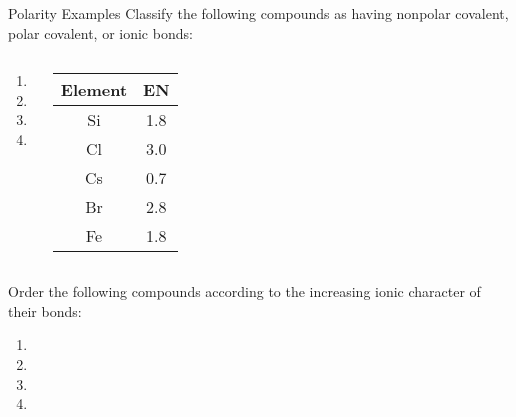 \documentclass[notes=hide]{beamer}
\begin{document}
\begin{frame}[t]{Polarity Examples}
	Classify the following compounds as having nonpolar covalent, polar
	covalent, or ionic bonds:

	\begin{columns}
		\begin{enumerate}
			\item {}
			\item {}
			\item {}
			\item {}
		\end{enumerate}
		\centering
		\begin{tabular} {c S[table-format=1.1]}
			\textbf{Element} & \textbf{EN} \\ \midrule
			Si & 1.8 \\
			Cl & 3.0 \\
			Cs & 0.7 \\
			Br & 2.8 \\
			Fe & 1.8 \\
		\end{tabular}
	\end{columns}

\end{frame}

\begin{onyourown}{4em}
	Order the following compounds according to the increasing ionic
	character of their bonds:

	\begin{enumerate}
		\item {}
		\item {}
		\item {}
		\item {}
	\end{enumerate}
\end{onyourown}
\end{document}
